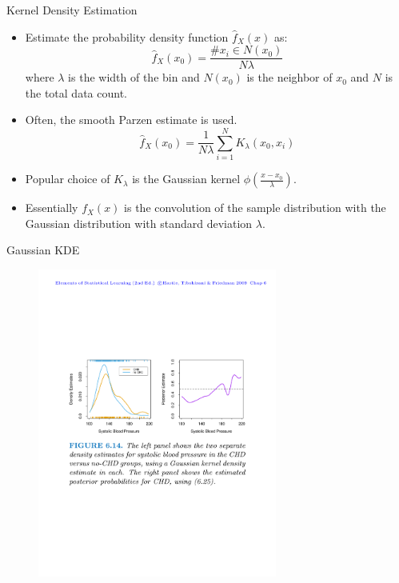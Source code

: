 \documentclass{beamer}
\begin{document}
\begin{frame}{Kernel Density Estimation}
    \begin{itemize}
        \item Estimate the probability density function $\hat{f}_X(x)$ as:
        \begin{equation*}
            \hat{f}_X(x_0) = \frac{\# x_i \in N(x_0)}{N\lambda}
        \end{equation*}
        where $\lambda$ is the width of the bin and $N(x_0)$ is the neighbor of $x_0$ and $N$ is the total data count.
        \item Often, the smooth Parzen estimate is used.
        \begin{equation*}
            \hat{f}_X(x_0) = \frac{1}{N\lambda}\sum_{i=1}^{N} K_{\lambda}(x_0, x_i)
        \end{equation*}
        \item Popular choice of $K_{\lambda}$ is the Gaussian kernel $\phi(\frac{x-x_0}{\lambda})$.
        \item Essentially $f_X(x)$ is the convolution of the sample distribution with the Gaussian distribution with standard deviation $\lambda$.
    \end{itemize}
\end{frame}


\begin{frame}{Gaussian KDE}
\begin{figure}
    \centering
    \includegraphics[width=0.7\textwidth]{figures/gaussian_kde.pdf}
\end{figure}
\end{frame}
\end{document}
